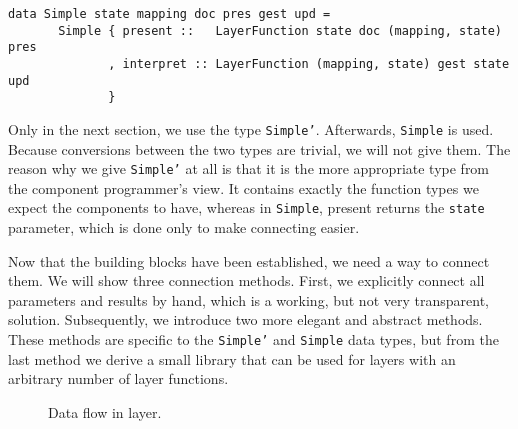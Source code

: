 \begin{small}
\begin{verbatim}
data Simple state mapping doc pres gest upd =
       Simple { present ::   LayerFunction state doc (mapping, state) pres
              , interpret :: LayerFunction (mapping, state) gest state upd
              }
\end{verbatim}
\end{small}

Only in the next section, we use the type \texttt{Simple'}. Afterwards, \texttt{Simple} is used. Because conversions between the two types are trivial, we will not give them. The reason why we give \texttt{Simple'} at all is that it is the more appropriate type from the component programmer's view. It contains exactly the function types we expect the components to have, whereas in \texttt{Simple}, present returns the \texttt{state} parameter, which is done only to make connecting easier.

Now that the building blocks have been established, we need a way to connect them. We will show three connection methods. First, we explicitly connect all parameters and results by hand, which is a working, but not very transparent, solution. Subsequently, we introduce two more elegant and abstract methods. These methods are specific to the \texttt{Simple'} and \texttt{Simple} data types, but from the last method we derive a small library that can be used for layers with an arbitrary number of layer functions. 

\begin{figure}
\begin{small}
\begin{center}
\begin{center}
\begin{scriptsize}
\end{scriptsize}
\end{center}\caption{Data flow in layer.}\label{wrapped} 
\end{center}
\end{small}
\end{figure}

